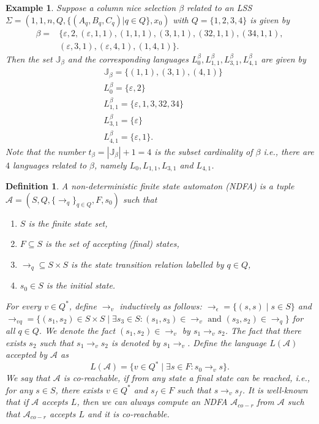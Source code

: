 \documentclass[journal]{IEEEtran}
\newtheorem{Definition}{Definition}
\newtheorem{Example}{Example}
\begin{document}
\begin{Example}
	Suppose a column nice selection $\beta$ related to an LSS $\Sigma=(1,1,n,Q,\{(A_q,B_q,C_q)|q \in Q\},x_0)$ with $Q=\{1,2,3,4\}$ is given by
	\begin{align*}
		\beta= & \{ \varepsilon, 2, (\varepsilon,1,1), (1,1,1), (3,1,1), (32,1,1), (34,1,1), \\
		& (\varepsilon,3,1), (\varepsilon,4,1), (1,4,1) \}.
	\end{align*}
	Then the set $\mathbb{J}_\beta$ and the corresponding languages $L^\beta_0, L^\beta_{1,1}, L^\beta_{3,1}, L^\beta_{4,1}$ are given by
	\begin{align*}
	    & \mathbb{J}_\beta=\{ (1,1), (3,1), (4,1) \} \\
		& L^\beta_0= \{ \varepsilon, 2 \} \\
		& L^\beta_{1,1}= \{ \varepsilon, 1, 3, 32, 34 \} \\
		& L^\beta_{3,1}= \{ \varepsilon \} \\
		& L^\beta_{4,1}= \{ \varepsilon, 1 \}.
	\end{align*}
	Note that the number $t_\beta=|\mathbb{J}_\beta|+1=4$ is the subset cardinality of $\beta$ i.e., there are $4$ languages related to $\beta$, namely $L_0, L_{1,1}, L_{3,1}$ and $L_{4,1}$.
\end{Example}

\begin{Definition} \label{def:NDFA}
	A non-deterministic finite state automaton (NDFA) is a tuple $\mathcal{A}=(S,Q,\{\rightarrow_q\}_{q \in Q} ,F, s_0)$ such that
	\begin{enumerate}
		\item $S$ is the finite state set,
		\item $F \subseteq S$ is the set of accepting (final) states,
		\item $\rightarrow_q \subseteq S \times S$ is the state transition relation labelled by $q \in Q$,
		\item $s_0 \in S$ is the initial state.
	\end{enumerate}
	For every $v \in Q^{*}$, define $\rightarrow_v$ inductively as follows: $\rightarrow_{\epsilon}=\{ (s,s) \mid s \in S \}$ and $\rightarrow_{vq} = \{ (s_1,s_2) \in S \times S \mid \exists s_3 \in S: (s_1,s_3) \in \rightarrow_{v} \mbox{ and } (s_3,s_2) \in \rightarrow_q \}$ for all $q \in Q$. We denote the fact $(s_1,s_2) \in \rightarrow_v$ by $s_1 \rightarrow_v s_2$. The fact that there exists $s_2$ such that $s_1 \rightarrow_v s_2$ is denoted by $s_1 \rightarrow_v$. Define the language $L(\mathcal{A})$ accepted by $\mathcal{A}$ as 
	\[
	L(\mathcal{A})=\{ v \in Q^{*} \mid \exists s \in F: s_0 \rightarrow_v s \}.
	\]
	We say that $\mathcal{A}$ is \emph{co-reachable}, if from any state a final state can be reached, i.e., for any $s \in S$, there exists $v \in Q^*$ and $s_f \in F$ such that $s \rightarrow_v s_f$. It is well-known that if $\mathcal{A}$ accepts $L$, then we can always compute an NDFA $\mathcal{A}_{co-r}$ from $\mathcal{A}$ such that $\mathcal{A}_{co-r}$ accepts $L$ and it is co-reachable.
\end{Definition}
\end{document}

